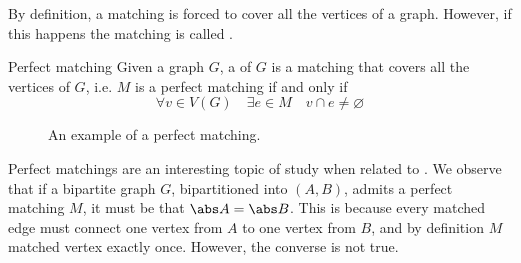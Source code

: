 \documentclass[a4paper, 12pt]{report}
\begin{document}
    By definition, a matching is  forced to cover all the vertices of a graph. However, if this happens the matching is called .

    \begin{frameddefn}{Perfect matching}
        Given a graph $G$, a  of $G$ is a matching that covers all the vertices of $G$, i.e. $M$ is a perfect matching if and only if $$\forall v \in V(G) \quad \exists e \in M \quad v \cap e \neq \varnothing$$
    \end{frameddefn}

    \begin{figure}[H]
        \centering
        \caption{An example of a perfect matching.}
    \end{figure}

    Perfect matchings are an interesting topic of study when related to . We observe that if a bipartite graph $G$, bipartitioned into $(A, B)$, admits a perfect matching $M$, it must be that $\abs A = \abs B$. This is because every matched edge must connect one vertex from $A$ to one vertex from $B$, and by definition $M$ matched  vertex exactly once. However, the converse is not true.
\end{document}
